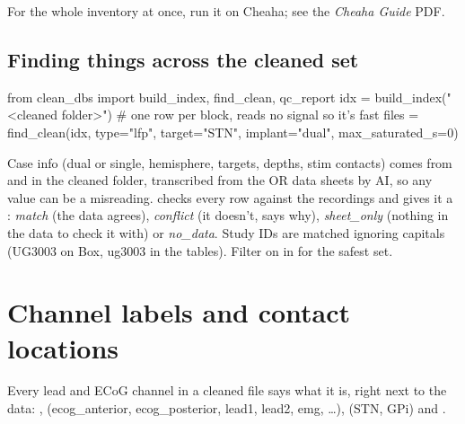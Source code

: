 For the whole inventory at once, run it on Cheaha; see the \textit{Cheaha Guide} PDF.

\subsection{Finding things across the cleaned set}
\begin{codebox}
from clean_dbs import build_index, find_clean, qc_report
idx = build_index("<cleaned folder>")      # one row per block, reads no signal so it's fast
files = find_clean(idx, type="lfp", target="STN", implant="dual", max_saturated_s=0)
\end{codebox}
Case info (dual or single, hemisphere, targets, depths, stim contacts) comes from  and  in the cleaned folder, transcribed from the OR data sheets by AI, so any value can be a misreading.  checks every row against the recordings and gives it a : \textit{match} (the data agrees), \textit{conflict} (it doesn't,  says why), \textit{sheet\_only} (nothing in the data to check it with) or \textit{no\_data}. Study IDs are matched ignoring capitals (UG3003 on Box, ug3003 in the tables). Filter on  in  for the safest set.

\section{Channel labels and contact locations}

Every lead and ECoG channel in a cleaned file says what it is, right next to the data: ,  (ecog\_anterior, ecog\_posterior, lead1, lead2, emg, \ldots),  (STN, GPi) and .

